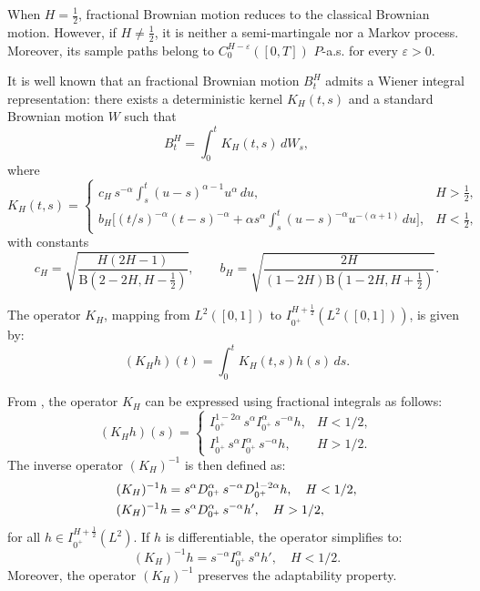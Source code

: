 \documentclass{article}
\theoremstyle{definition}  %
\theoremstyle{plain}  %
\begin{document}
When $H=\tfrac{1}{2}$, fractional Brownian motion reduces to the classical Brownian motion.  
However, if $H\neq \tfrac{1}{2}$, it is neither a semi-martingale nor a Markov process. Moreover, its sample paths belong to $C^{H-\varepsilon}_0([0,T])$ $P$-a.s. for every $\varepsilon>0$.

It is well known that an fractional Brownian motion $B^H_t$ admits a Wiener integral representation: there exists a deterministic kernel $K_H(t,s)$ and a standard Brownian motion $W$ such that  
\[
  B^H_t = \int_0^t K_H(t,s)\,dW_s,
\]
where
\[
  K_H(t,s)=
  \begin{cases}
    c_H\, s^{-\alpha}\displaystyle\int_s^t (u-s)^{\alpha-1}u^\alpha\,du, & H>\tfrac{1}{2}, \\[2ex]
    b_H\Big[(t/s)^{-\alpha}(t-s)^{-\alpha}
    +\alpha s^\alpha \int_s^t (u-s)^{-\alpha}u^{-(\alpha+1)}\,du\Big], & H<\tfrac{1}{2},
  \end{cases}
\]
with constants
\[
  c_H=\sqrt{\frac{H(2H-1)}{\mathrm{B}(2-2H,H-\tfrac{1}{2})}}, 
  \qquad 
  b_H=\sqrt{\frac{2H}{(1-2H)\mathrm{B}(1-2H,H+\tfrac{1}{2})}}.
\]

The operator \( K_H \), mapping from \( L^2([0,1]) \) to \( I_{0^+}^{H+\frac{1}{2}}(L^2([0,1])) \), is given by:  
\begin{equation}
	(K_Hh)(t) = \int_0^t K_H(t,s) h(s) \, ds.\label{kh operator}
\end{equation}


   
 From \cite[Lemma 10]{Nualart}, the operator \( K_H \) can be expressed using fractional integrals as follows:   
\[
(K_H h)(s) = \begin{cases}
\displaystyle
I^{1-2\alpha}_{0^+} \, s^{\alpha} I^{\alpha}_{0^+} \, s^{-\alpha} h, & H <1/2, \\
\displaystyle
I^{1}_{0^+} \, s^{\alpha} I^{\alpha}_{0^+} \, s^{-\alpha} h, & H >1/2.
\end{cases}
\]  
 The inverse operator \((K_H)^{-1}\) is then defined as:  
\begin{align}  
\notag (K_H)^{-1} h &= s^{\alpha} D^{\alpha}_{0^+} \, s^{-\alpha} D^{1-2\alpha}_{0^+} h, \quad H < 1/2, \\  
(K_H)^{-1} h &= s^{\alpha} D^{\alpha}_{0^+} \, s^{-\alpha} h', \quad H > 1/2,\label{g1/2}   
\end{align}    
for all \(h \in I^{H+\frac{1}{2}}_{0^+}(L^2)\). If \(h\) is differentiable, the operator simplifies to:  
\begin{equation} \label{l1/2}  
(K_H)^{-1} h = s^{-\alpha} I^{\alpha}_{0^+} \, s^{\alpha} h', \quad H <1/2.  
\end{equation}  
Moreover, the operator \((K_H)^{-1}\) preserves the adaptability property.
\end{document}
